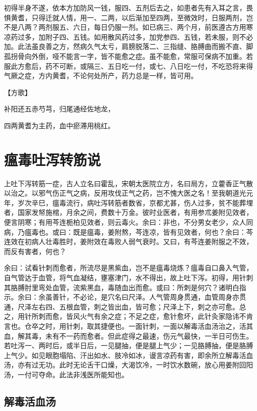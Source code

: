 \documentclass[a4paper,12pt,UTF8,twoside]{ctexbook}
\begin{document}
	初得半身不遂，依本方加防风一钱，服四、五剂后去之，如患者先有入耳之言，畏惧黄耆，只得迁就人情，用一、二两，以后渐加至四两，至微效时，日服两剂，岂不是八两？两剂服五、六日，每日仍服一剂。如已病三、两个月，前医遵古方用寒凉药过多，加附子四、五钱。如用散风药过多，加党参四、五钱，若未服，则不必加。此法虽良善之方，然病久气太亏，肩膀脱落二、三指缝、胳膊曲而搬不直、脚孤拐骨向外倒，哑不能言一字，皆不能愈之症。虽不能愈，常服可保病不加重。若服此方愈后，药不可断，或隔三、五日吃一付，或七、八日吃一付，不吃恐将来得气厥之症，方内黄耆，不论何处所产，药力总是一样，皆可用。
	
	【方歌】
	
	补阳还五赤芍芎，归尾通经佐地龙，
	
	四两黄耆为主药，血中瘀滞用桃红。
	
	\chapter{瘟毒吐泻转筋说}
	
	
	上吐下泻转筋一症，古人立名曰霍乱，宋朝太医院立方，名曰局方，立藿香正气散以治之。以邪气伤正气之病，反用攻伐正气之药，岂不愧大医之名！至我朝道光元年，岁次辛巳，瘟毒流行，病吐泻转筋者数省，京都尤甚，伤人过多，贫不能葬埋者，国家发帑施棺，月余之间，费数十万金。彼时业医者，有用参朮姜附见效者，便言阴寒；有用芩连栀柏见效者，则云毒火。余曰：非也，不分男女老少，众人同病，乃瘟毒也。或曰：既是瘟毒，姜附熬，芩连凉，皆有见效者，何也？余曰：芩连效在初病人壮毒胜时，姜附效在毒败人弱气衰时。又曰，有芩连姜附服之不效，而反有害者，何也？
	
	余曰：试看针刺而愈者，所流尽是黑紫血，岂不是瘟毒烧炼？瘟毒自口鼻入气管，自气管达于血管，将气血凝结，壅塞津门，水不得出，故上吐下泻。初得，用针刺其胳膊肘里弯处血管，流紫黑血，毒随血出而愈。或曰：所刺是何穴？诸明白指示。余曰：余虽善针，不必论，是穴名曰尺泽。人气管周身贯通，血管周身亦贯通，尺泽左右四、五根血管，刺之皆出血，皆可愈；尺泽上下，刺之亦可愈。总之，用针所刺而愈，皆风火气有余之症；不足之症，愈针愈坏，此针灸家隐讳不肯言也。仓卒之时，用针刺，取其捷便也。一面针刺，一面以解毒活血汤治之，活其血，解其毒，未有不一药而愈者。但此症得之最速，伤元气最快，一半日可伤生。若吐泻一、两时后，或半日后，一见腿抽，便是腿上气少；一见胳膊抽，便是胳膊上气少。如见眼胞塌陷、汗出如水、肢冷如冰，谩言凉药有害，即余所立解毒活血汤，亦有过无功。此时无论舌干口燥，大渴饮冷，一时饮水数碗，放心用姜附回阳汤，一付可夺命。此法非浅医所能知也。
	
	\section{解毒活血汤}
	
\end{document}
